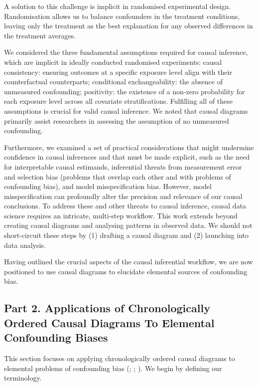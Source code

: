 \documentclass[
  singlecolumn,
  9pt]{article}
\begin{document}
A solution to this challenge is implicit in randomised experimental
design. Randomisation allows us to balance confounders in the treatment
conditions, leaving only the treatment as the best explanation for any
observed differences in the treatment averages.

We considered the three fundamental assumptions required for causal
inference, which are implicit in ideally conducted randomised
experiments: causal consistency: ensuring outcomes at a specific
exposure level align with their counterfactual counterparts; conditional
exchangeability: the absence of unmeasured confounding; positivity: the
existence of a non-zero probability for each exposure level across all
covariate stratifications. Fulfilling all of these assumptions is
crucial for valid causal inference. We noted that causal diagrams
primarily assist researchers in assessing the assumption of no
unmeasured confounding.

Furthermore, we examined a set of practical considerations that might
undermine confidence in causal inferences and that must be made
explicit, such as the need for interpretable causal estimands,
inferential threats from measurement error and selection bias (problems
that overlap each other and with problems of confounding bias), and
model misspecification bias. However, model misspecification can
profoundly alter the precision and relevance of our causal conclusions.
To address these and other threats to causal inference, causal data
science requires an intricate, multi-step workflow. This work extends
beyond creating causal diagrams and analysing patterns in observed data.
We should not short-circuit these steps by (1) drafting a causal diagram
and (2) launching into data analysis.

Having outlined the crucial aspects of the causal inferential workflow,
we are now positioned to use causal diagrams to elucidate elemental
sources of confounding bias.

\subsection{Part 2. Applications of Chronologically Ordered Causal
Diagrams To Elemental Confounding
Biases}\label{part-2.-applications-of-chronologically-ordered-causal-diagrams-to-elemental-confounding-biases}

This section focuses on applying chronologically ordered causal diagrams
to elemental problems of confounding bias
(;
; ). We begin by defining our terminology.
\end{document}
